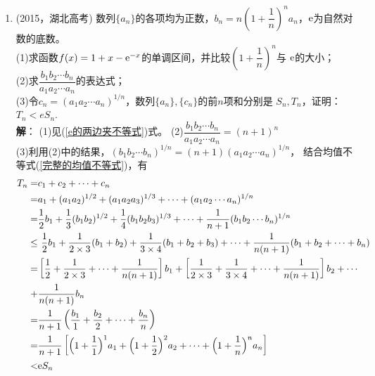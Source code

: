 \begin{enumerate}[label={\textbf{\arabic*.}},leftmargin=
    \inteval{\myenumleftmargin}pt]
\item (2015，湖北高考) 数列$ \{a_n\} $的各项均为正数，$ b_n=n\left(1+\dfrac{1}{n}\right)^na_n $，$ \mathrm{e} $为自然对数的底数。\\
(1)求函数$ f(x)=1+x-\mathrm{e}^{-x} $的单调区间，并比较$ \left(1+\dfrac{1}{n}\right)^n $与
$ \mathrm{e} $的大小；\\
(2)求$ \dfrac{b_1b_2\cdots b_n}{a_1a_2\cdots a_n} $的表达式；\\
(3)令$ c_n=(a_1a_2\cdots a_n)^{1/n} $，数列$ \{a_n\},\{c_n\} $的前$ n $项和分别是
$ S_n,T_n $，证明：$ T_n<eS_n $.
\ifteach \\ \textbf{解}：
(1)见(\ref{e的两边夹不等式})式。 \quad (2)$ \dfrac{b_1b_2\cdots b_n}{a_1a_2\cdots a_n}=(n+1)^n $  \\
(3)利用(2)中的结果，$ (b_1b_2\cdots b_n)^{1/n}=(n+1)(a_1a_2\cdots a_n)^{1/n} $，
结合均值不等式(\ref{完整的均值不等式})，有
\begin{align*}
    T_n=&c_1+c_2+\cdots +c_n \\
    =&a_1+(a_1a_2)^{1/2}+(a_1a_2a_3)^{1/3}+\cdots + (a_1a_2\cdots a_n)^{1/n}\\
    =&\dfrac{1}{2}b_1+\dfrac{1}{3}(b_1b_2)^{1/2}+\dfrac{1}{4}(b_1b_2b_3)^{1/3}+
    \cdots+\dfrac{1}{n+1}(b_1b_2\cdots b_n)^{1/n} \\
    \leq &\ \dfrac{1}{2}b_1+\dfrac{1}{2\times 3}(b_1+b_2)+\dfrac{1}{3\times 4}(b_1+
    b_2+b_3)+\cdots +\dfrac{1}{n(n+1)}(b_1+b_2+\cdots +b_n) \\
    =&\left[\dfrac{1}{2}+\dfrac{1}{2\times 3}+\cdots+\dfrac{1}{n(n+1)}\right]b_1+
    \left[\dfrac{1}{2\times 3}+\dfrac{1}{3\times 4}+\cdots+\dfrac{1}{n(n+1)}\right]b_2+
    \cdots\\
    +&\dfrac{1}{n(n+1)}b_n \\
    =&\dfrac{1}{n+1}\left(\dfrac{b_1}{1}+\dfrac{b_2}{2}+\cdots+\dfrac{b_n}{n}\right) \\
    =&\dfrac{1}{n+1}\left[\Big(1+\dfrac{1}{1}\Big)^1 a_1+\Big(1+\dfrac{1}{2}\Big)^2 a_2+\cdots+\Big(1+\dfrac{1}{n}\Big)^n a_n \right] \\
    <& \mathrm{e} S_n
\end{align*}
 \fi


\end{enumerate}
